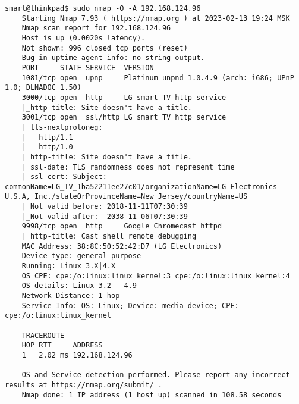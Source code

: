 \begin{Verbatim}[frame=single]
    smart@thinkpad$ sudo nmap -O -A 192.168.124.96
    Starting Nmap 7.93 ( https://nmap.org ) at 2023-02-13 19:24 MSK
    Nmap scan report for 192.168.124.96
    Host is up (0.0020s latency).
    Not shown: 996 closed tcp ports (reset)
    Bug in uptime-agent-info: no string output.
    PORT     STATE SERVICE  VERSION
    1081/tcp open  upnp     Platinum unpnd 1.0.4.9 (arch: i686; UPnP 1.0; DLNADOC 1.50)
    3000/tcp open  http     LG smart TV http service
    |_http-title: Site doesn't have a title.
    3001/tcp open  ssl/http LG smart TV http service
    | tls-nextprotoneg: 
    |   http/1.1
    |_  http/1.0
    |_http-title: Site doesn't have a title.
    |_ssl-date: TLS randomness does not represent time
    | ssl-cert: Subject: commonName=LG_TV_1ba52211ee27c01/organizationName=LG Electronics U.S.A, Inc./stateOrProvinceName=New Jersey/countryName=US
    | Not valid before: 2018-11-11T07:30:39
    |_Not valid after:  2038-11-06T07:30:39
    9998/tcp open  http     Google Chromecast httpd
    |_http-title: Cast shell remote debugging
    MAC Address: 38:8C:50:52:42:D7 (LG Electronics)
    Device type: general purpose
    Running: Linux 3.X|4.X
    OS CPE: cpe:/o:linux:linux_kernel:3 cpe:/o:linux:linux_kernel:4
    OS details: Linux 3.2 - 4.9
    Network Distance: 1 hop
    Service Info: OS: Linux; Device: media device; CPE: cpe:/o:linux:linux_kernel

    TRACEROUTE
    HOP RTT     ADDRESS
    1   2.02 ms 192.168.124.96

    OS and Service detection performed. Please report any incorrect results at https://nmap.org/submit/ .
    Nmap done: 1 IP address (1 host up) scanned in 108.58 seconds
\end{Verbatim}

